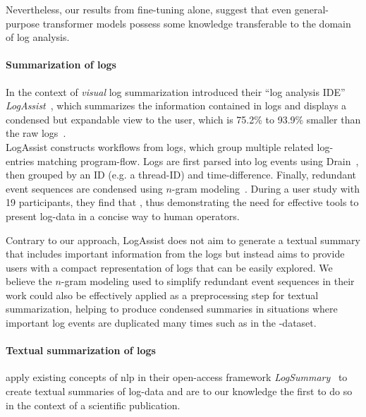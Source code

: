 Nevertheless, our results from fine-tuning alone,
suggest that even general-purpose transformer models possess some knowledge transferable to the domain of log analysis.

\paragraph{Summarization of logs}

In the context of \emph{visual} log summarization
\citeauthor{logassist} introduced their \enquote{log analysis IDE} \emph{LogAssist}~\parencite{logassist},
which summarizes the information contained in logs and displays a condensed but expandable view to the user,
which is 75.2\% to 93.9\% smaller than the raw logs~\parencite[7]{logassist}.\\
LogAssist constructs workflows from logs, which group multiple related log-entries matching program-flow.
Logs are first parsed into log events using Drain~\parencite{drain},
then grouped by an ID (e.g. a thread-ID) and time-difference.
Finally, redundant event sequences are condensed using \(n\)-gram modeling~\parencite[3-4]{logassist}.
During a user study with 19 participants, they find that
,
thus demonstrating the need for effective tools to present log-data in a concise way to human operators.

Contrary to our approach,
LogAssist does not aim to generate a textual summary that includes important information from the logs
but instead aims to provide users with a compact representation of logs that can be easily explored.
We believe the \(n\)-gram modeling used to simplify redundant event sequences in their work
could also be effectively applied as a preprocessing step for textual summarization,
helping to produce condensed summaries in situations where important log events
are duplicated many times such as in the \hadoop{}-dataset.

\paragraph{Textual summarization of logs}

\citeauthor{log_summary} apply existing concepts of \ac{nlp}
in their open-access framework \emph{LogSummary}~\parencite{log_summary}
to create textual summaries of log-data and are to our knowledge the first to do so in the context of a scientific publication.

